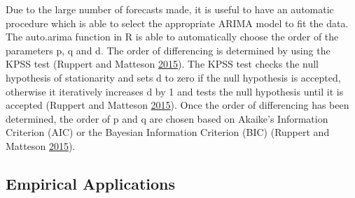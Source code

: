 \documentclass[12pt,preprint, authoryear]{elsarticle}
\numberwithin{equation}{section}
\numberwithin{figure}{section}
\numberwithin{table}{section}
\begin{document}
Due to the large number of forecasts made, it is useful to have an
automatic procedure which is able to select the appropriate ARIMA model
to fit the data. The auto.arima function in R is able to automatically
choose the order of the parameters p, q and d. The order of differencing
is determined by using the KPSS test (Ruppert and Matteson
\protect\hyperlink{ref-ruppert2015}{2015}). The KPSS test checks the
null hypothesis of stationarity and sets d to zero if the null
hypothesis is accepted, otherwise it iteratively increases d by 1 and
tests the null hypothesis until it is accepted (Ruppert and Matteson
\protect\hyperlink{ref-ruppert2015}{2015}). Once the order of
differencing has been determined, the order of p and q are chosen based
on Akaike's Information Criterion (AIC) or the Bayesian Information
Criterion (BIC) (Ruppert and Matteson
\protect\hyperlink{ref-ruppert2015}{2015}).

\subsection{Empirical Applications}\label{empirical-applications}
\end{document}
